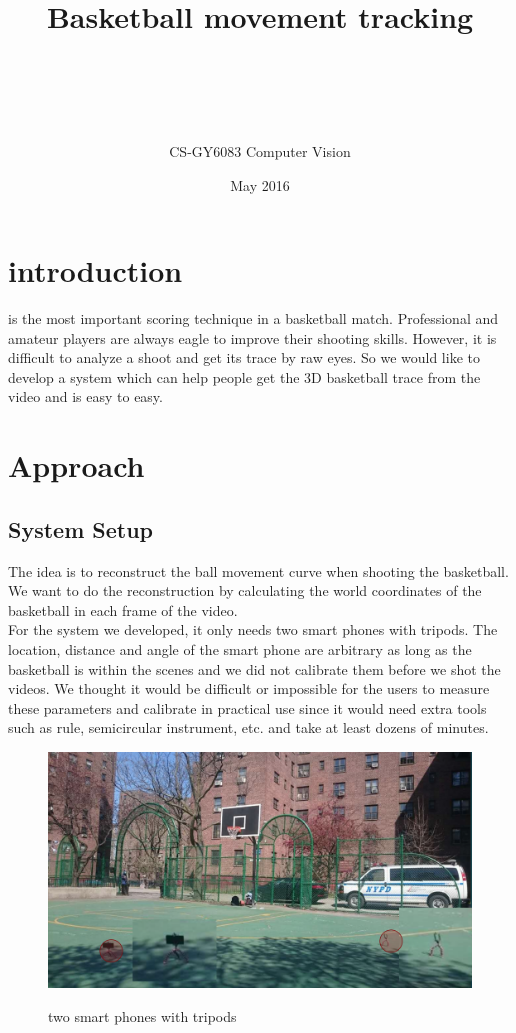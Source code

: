 \documentclass[10pt,journal,compsoc]{IEEEtran}
\title{Basketball movement tracking}
\author{\IEEEauthorblockN{Wei Hong (\it wh951\rm)}\\
\and\IEEEauthorblockN{Nan Wang (\it nw953\rm)}\\\ \\\and{CS-GY6083 Computer Vision} \\\and{May 2016}}
\begin{document}
\maketitle
\section{\textbf{introduction}}
 is the most important scoring technique in a basketball match. Professional and amateur players are always eagle to improve their shooting skills. However, it is difficult to analyze a shoot and get its trace by raw eyes. So we would like to develop a system which can help people get the 3D basketball trace from the video and is easy to easy.
\section{\textbf{Approach}}
\subsection{System Setup}
The idea is to reconstruct the ball movement curve when shooting the basketball. We want to do the reconstruction by calculating the world coordinates of the basketball in each frame of the video. 
\\For the system we developed, it only needs two smart phones with tripods. The location, distance and angle of the smart phone are arbitrary as long as the basketball is within the scenes and we did not calibrate them before we shot the videos. We thought it would be difficult or impossible for the users to measure these parameters and calibrate in practical use since it would need extra tools such as rule, semicircular instrument, etc. and take at least dozens of minutes.
\begin{figure}[h]
\centering
{
\includegraphics[width=3.4 in]{setup.png}
}
\caption{two smart phones with tripods}
\end{figure}
\end{document}
